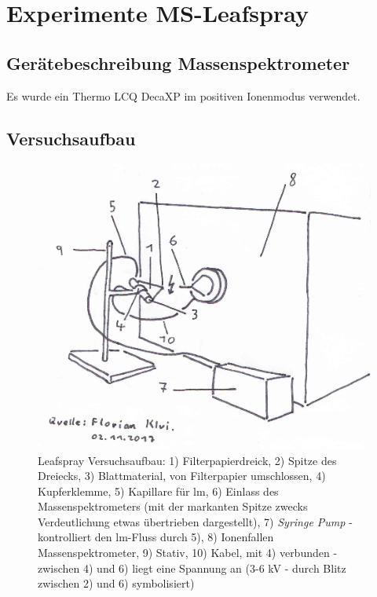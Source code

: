 \chapter{Experimente MS-Leafspray} \label{sec:MSLeafspray}

\section{Gerätebeschreibung Massenspektrometer}

Es wurde ein Thermo LCQ DecaXP im positiven Ionenmodus verwendet.

\section{Versuchsaufbau} \label{sec:Versuchsaufbau}


\begin{figure}[!hbtp]
  \centering
  \includegraphics[scale=0.5]{figures/Kapitel4/VWA_MSLeafspray_Versuchsaufbau.png}
  \caption[MS Leafspray Versuchsaufbau, Quelle: Autor]{Leafspray Versuchsaufbau: 1) Filterpapierdreick, 2) Spitze des Dreiecks, 3) Blattmaterial, von Filterpapier umschlossen, 4) Kupferklemme, 5) Kapillare für \gls{lm}, 6) Einlass des Massenspektrometers (mit der markanten Spitze zwecks Verdeutlichung etwas übertrieben dargestellt), 7) \textit{Syringe Pump} - kontrolliert den \gls{lm}-Fluss durch 5), 8) Ionenfallen Massenspektrometer, 9) Stativ, 10) Kabel, mit 4) verbunden - zwischen 4) und 6) liegt eine Spannung   an (3-6 kV - durch Blitz zwischen 2) und 6) symbolisiert)}
  \label{fig:LeafsprayVersuchsaufbau}
\end{figure}

